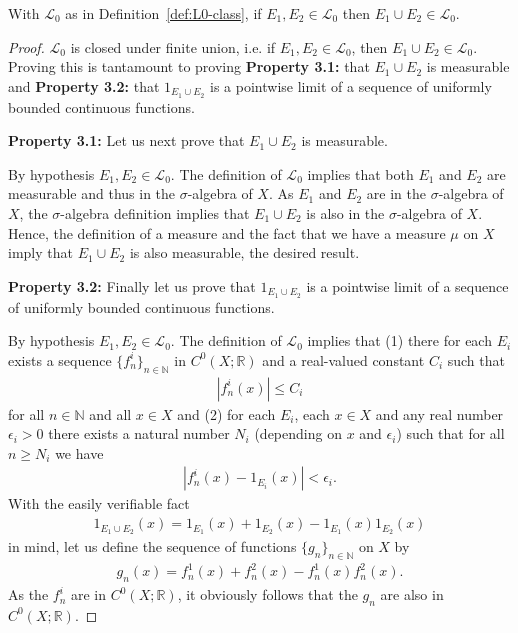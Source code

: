 \begin{proposition}
    \label{prpstn:L0-union}
    \leanok
    With $\mathcal{L}_0$ as in Definition~\ref{def:L0-class}, if $E_1, E_2 \in \mathcal{L}_0$ then $E_1 \cup E_2 \in \mathcal{L}_0$.
\end{proposition}
\begin{proof}
    \leanok
$\mathcal{L}_0$ is closed under finite union, i.e. if $E_1,E_2 \in \mathcal{L}_0$, then $E_1 \cup E_2 \in \mathcal{L}_0$. Proving this is tantamount to proving \textbf{Property 3.1:} that $E_1 \cup E_2$ is measurable and \textbf{Property 3.2:} that $1_{E_1 \cup E_2}$ is a pointwise limit of a sequence of uniformly bounded continuous functions.

\textbf{Property 3.1:} Let us next prove that $E_1 \cup E_2$ is measurable.

By hypothesis $E_1,E_2 \in \mathcal{L}_0$. The definition of $\mathcal{L}_0$ implies that both $E_1$ and $E_2$ are measurable and thus in the $\sigma$-algebra of $X$. As $E_1$ and $E_2$ are in the $\sigma$-algebra of $X$, the $\sigma$-algebra definition implies that $E_1 \cup E_2$ is also in the $\sigma$-algebra of $X$. Hence, the definition of a measure and the fact that we have a measure $\mu$ on $X$ imply that $E_1 \cup E_2$ is also measurable, the desired result.

\textbf{Property 3.2:} Finally let us prove that $1_{E_1 \cup E_2}$ is a pointwise limit of a sequence of uniformly bounded continuous functions.

By hypothesis $E_1,E_2 \in \mathcal{L}_0$. The definition of $\mathcal{L}_0$ implies that (1) there for each $E_i$ exists a sequence $\{ f^i_n \}_{n \in \mathbb{N}}$ in $C^0(X; \mathbb{R})$ and a real-valued constant $C_i$ such that
\begin{align}
    \left\lvert f^i_n(x) \right\rvert \le C_i
\end{align}
for all $n \in \mathbb{N}$ and all $x \in X$ and (2) for each $E_i$, each $x \in X$ and any real number $\epsilon_i > 0$ there exists a natural number $N_i$ (depending on $x$ and $\epsilon_i$) such that for all $n \ge N_i$ we have
\begin{align}
    \left\lvert f^i_n(x) - 1_{E_i}(x) \right\rvert < \epsilon_i.
\end{align}
With the easily verifiable fact
\begin{align}
    1_{E_1 \cup E_2}(x) = 1_{E_1}(x) + 1_{E_2}(x) - 1_{E_1}(x) 1_{E_2}(x)
\end{align}
in mind, let us define the sequence of functions $\{ g_n \}_{n \in \mathbb{N}}$ on $X$ by
\begin{align}
    g_n(x) = f^1_n(x) + f^2_n(x) - f^1_n(x) f^2_n(x).
\end{align}
As the $f^i_n$ are in $C^0(X; \mathbb{R})$, it obviously follows that the $g_n$ are also in $C^0(X; \mathbb{R})$.


\end{proof}
